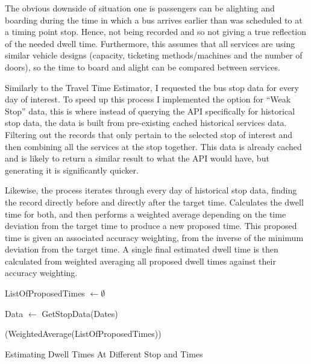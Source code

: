 \documentclass{article}
\begin{document}
\par 
The obvious downside of situation one is passengers can be alighting and boarding during the time in which a bus arrives earlier than was scheduled to at a timing point stop. Hence, not being recorded and so not giving a true reflection of the needed dwell time. Furthermore, this assumes that all services are using similar vehicle designs (capacity, ticketing methods/machines and the number of doors), so the time to board and alight can be compared between services.

\par 
Similarly to the Travel Time Estimator, I requested the bus stop data for every day of interest. To speed up this process I implemented the option for ``Weak Stop'' data, this is where instead of querying the API specifically for historical stop data, the data is built from pre-existing cached historical services data. Filtering out the records that only pertain to the selected stop of interest and then combining all the services at the stop together. This data is already cached and is likely to return a similar result to what the API would have, but generating it is significantly quicker.


\par 
Likewise, the process iterates through every day of historical stop data, finding the record directly before and directly after the target time. Calculates the dwell time for both, and then performs a weighted average depending on the time deviation from the target time to produce a new proposed time. This proposed time is given an associated accuracy weighting, from the inverse of the minimum deviation from the target time. A single final estimated dwell time is then calculated from weighted averaging all proposed dwell times against their accuracy weighting.


\begin{algorithm}[H]
	\SetAlgoLined
	
	
	ListOfProposedTimes $\gets \emptyset$ 
	
	Data $\gets$ GetStopData(Dates)
	
	
	\KwRet(WeightedAverage(ListOfProposedTimes))
	
	\caption{Estimating Dwell Times At Different Stop and Times}
\end{algorithm}
\end{document}

